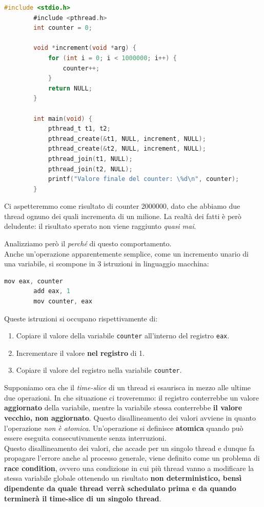 \documentclass[12pt]{report}
\begin{document}
	\begin{lstlisting}[language=C, style=stile-listings]
		#include <stdio.h>
		#include <pthread.h>
		int counter = 0;
		
		void *increment(void *arg) {
			for (int i = 0; i < 1000000; i++) {
				counter++;
			}
			return NULL;
		}
		
		int main(void) {
			pthread_t t1, t2;
			pthread_create(&t1, NULL, increment, NULL);
			pthread_create(&t2, NULL, increment, NULL);
			pthread_join(t1, NULL);
			pthread_join(t2, NULL);
			printf("Valore finale del counter: \%d\n", counter);
		}
	\end{lstlisting}
	
	Ci aspetteremmo come risultato di counter 2000000, dato che abbiamo due thread ognuno dei quali incrementa di un milione. La realtà dei fatti è però deludente: il risultato sperato non viene raggiunto \textit{quasi mai}.
	\smallbreak
	
	Analizziamo però il \textit{perché} di questo comportamento.\\
	Anche un'operazione apparentemente semplice, come un incremento unario di una variabile, si scompone in 3 istruzioni in linguaggio macchina:
	\begin{lstlisting}[language=C]
		mov eax, counter
		add eax, 1
		mov counter, eax
	\end{lstlisting}
	Queste istruzioni si occupano rispettivamente di:
	\begin{enumerate}
		\item Copiare il valore della variabile \texttt{counter} all'interno del registro \texttt{eax}.
		
		\item Incrementare il valore \textbf{nel registro} di 1.
		
		\item Copiare il valore del registro nella variabile \texttt{counter}.
	\end{enumerate}
	Supponiamo ora che il \textit{time-slice} di un thread si esaurisca in mezzo alle ultime due operazioni. In che situazione ci troveremmo: il registro conterrebbe un valore \textbf{aggiornato} della variabile, mentre la variabile stessa conterrebbe \textbf{il valore vecchio, non aggiornato}. Questo disallineamento dei valori avviene in quanto l'operazione \textit{non è atomica}. Un'operazione si definisce \textbf{atomica} quando può essere eseguita consecutivamente senza interruzioni.\\
	Questo disallineamento dei valori, che accade per un singolo thread e dunque fa propagare l'errore anche al processo generale, viene definito come un problema di \textbf{race condition}, ovvero una condizione in cui più thread vanno a modificare la stessa variabile globale ottenendo un risultato \textbf{non deterministico, bensì dipendente da quale thread verrà schedulato prima e da quando terminerà il time-slice di un singolo thread}.
	
\end{document}
